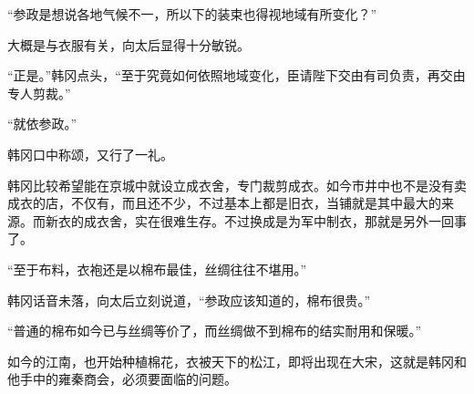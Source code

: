 “参政是想说各地气候不一，所以下的装束也得视地域有所变化？”

大概是与衣服有关，向太后显得十分敏锐。

“正是。”韩冈点头，“至于究竟如何依照地域变化，臣请陛下交由有司负责，再交由专人剪裁。”

“就依参政。”

韩冈口中称颂，又行了一礼。

韩冈比较希望能在京城中就设立成衣舍，专门裁剪成衣。如今市井中也不是没有卖成衣的店，不仅有，而且还不少，不过基本上都是旧衣，当铺就是其中最大的来源。而新衣的成衣舍，实在很难生存。不过换成是为军中制衣，那就是另外一回事了。

“至于布料，衣袍还是以棉布最佳，丝绸往往不堪用。”

韩冈话音未落，向太后立刻说道，“参政应该知道的，棉布很贵。”

“普通的棉布如今已与丝绸等价了，而丝绸做不到棉布的结实耐用和保暖。”

如今的江南，也开始种植棉花，衣被天下的松江，即将出现在大宋，这就是韩冈和他手中的雍秦商会，必须要面临的问题。
